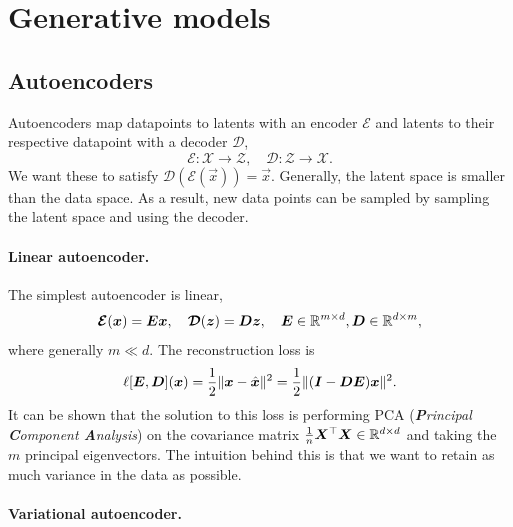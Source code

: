 \section{Generative models}

\subsection{Autoencoders}

Autoencoders map datapoints to latents with an encoder $\bm{\mathcal{E}}$ and latents to their
respective datapoint with a decoder $\bm{\mathcal{D}}$, \[
    \bm{\mathcal{E}}: \mathcal{X} \to \mathcal{Z}, \quad \bm{\mathcal{D}}: \mathcal{Z} \to \mathcal{X}.
\]
We want these to satisfy $\bm{\mathcal{D}}(\bm{\mathcal{E}}(\vec{x})) = \vec{x}$. Generally, the
latent space is smaller than the data space. As a result, new data points can be sampled by sampling
the latent space and using the decoder.

\paragraph{Linear autoencoder.}

The simplest autoencoder is linear, \[
    \bm{\mathcal{E}}(\bm{x}) = \bm{E} \bm{x}, \quad \bm{\mathcal{D}}(\bm{z}) = \bm{D} \bm{z}, \quad \bm{E} \in \mathbb{R}^{m \times d}, \bm{D} \in \mathbb{R}^{d \times m},
\]
where generally $m \ll d$. The reconstruction loss is \[
    \ell[\bm{E}, \bm{D}](\bm{x}) = \frac{1}{2} \| \bm{x} - \hat{\bm{x}} \|^2 = \frac{1}{2} \| (\bm{I} - \bm{D} \bm{E}) \bm{x} \|^2.
\]
It can be shown that the solution to this loss is performing PCA (\textit{\textbf{P}rincipal \textbf{C}omponent 
\textbf{A}nalysis}) on the covariance matrix $\frac{1}{n} \bm{X}^\top \bm{X} \in \mathbb{R}^{d \times d}$
and taking the $m$ principal eigenvectors. The intuition behind this is that we want to retain as
much variance in the data as possible.

\paragraph{Variational autoencoder.}

